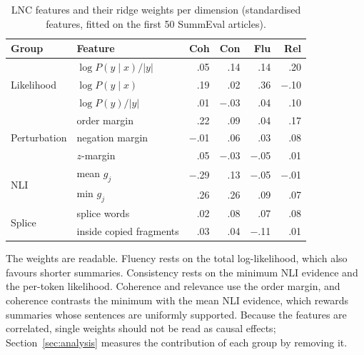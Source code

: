 \begin{table}[t]
\centering
\caption{LNC features and their ridge weights per dimension (standardised features, fitted on the first 50 SummEval articles).}
\label{tab:features}
\small
\begin{tabular}{@{}llrrrr@{}}
\toprule
Group & Feature & Coh & Con & Flu & Rel \\
\midrule
\multirow{3}{*}{Likelihood} & $\log P(y\mid x)/|y|$ & .05 & .14 & .14 & .20 \\
 & $\log P(y\mid x)$ & .19 & .02 & .36 & $-$.10 \\
 & $\log P(y)/|y|$ & .01 & $-$.03 & .04 & .10 \\
\midrule
\multirow{3}{*}{Perturbation} & order margin & .22 & .09 & .04 & .17 \\
 & negation margin & $-$.01 & .06 & .03 & .08 \\
 & $z$-margin & .05 & $-$.03 & $-$.05 & .01 \\
\midrule
\multirow{2}{*}{NLI} & mean $g_j$ & $-$.29 & .13 & $-$.05 & $-$.01 \\
 & min $g_j$ & .26 & .26 & .09 & .07 \\
\midrule
\multirow{2}{*}{Splice} & splice words & .02 & .08 & .07 & .08 \\
 & inside copied fragments & .03 & .04 & $-$.11 & .01 \\
\bottomrule
\end{tabular}
\end{table}

The weights are readable. Fluency rests on the total log-likelihood, which also favours shorter summaries. Consistency rests on the minimum NLI evidence and the per-token likelihood. Coherence and relevance use the order margin, and coherence contrasts the minimum with the mean NLI evidence, which rewards summaries whose sentences are uniformly supported. Because the features are correlated, single weights should not be read as causal effects; Section~\ref{sec:analysis} measures the contribution of each group by removing it.
